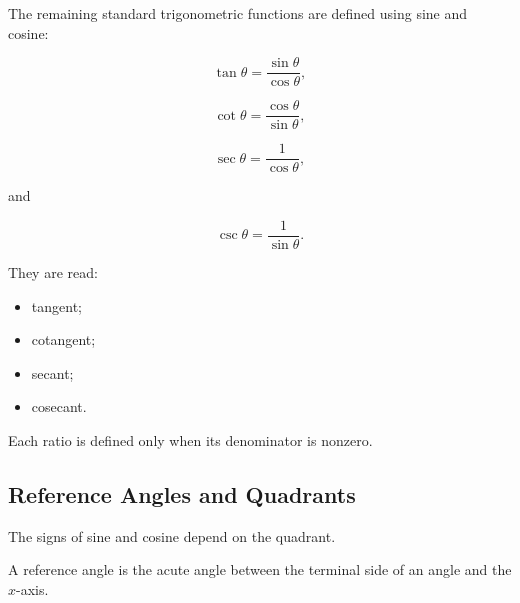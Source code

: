 The remaining standard trigonometric functions are defined using sine and
cosine:

\[ \tan\theta=\frac{\sin\theta}{\cos\theta}, \]

\[ \cot\theta=\frac{\cos\theta}{\sin\theta}, \]

\[ \sec\theta=\frac1{\cos\theta}, \]

and

\[ \csc\theta=\frac1{\sin\theta}. \]

They are read:

\begin{itemize}
    \item tangent;
    \item cotangent;
    \item secant;
    \item cosecant.
\end{itemize}

Each ratio is defined only when its denominator is nonzero.

\subsection{Reference Angles and Quadrants}
\label{subsec:reference-angles-quadrants}

The signs of sine and cosine depend on the quadrant.

\begin{center}
\end{center}

A reference angle is the acute angle between the terminal side of an angle
and the \(x\)-axis.

